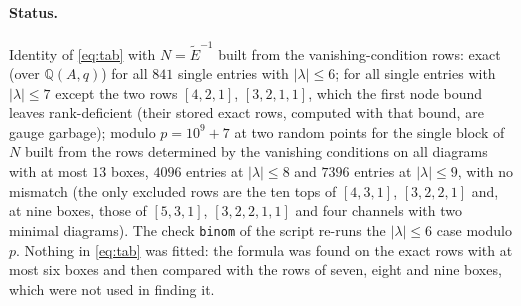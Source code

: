 \documentclass[11pt]{article}
\newcommand{\Et}{\widetilde{E}}
\newcommand{\LMPH}[1]{\texttt{#1}}
\begin{document}
\paragraph{Status.}  Identity of \eqref{eq:tab} with $N=\Et^{-1}$ built from the vanishing-condition rows: exact (over
$\mathbb Q(A,q)$) for all $841$ single entries with $|\lambda|\le6$; for all single entries with $|\lambda|\le7$ except
the two rows $[4,2,1]$, $[3,2,1,1]$, which the first node bound leaves rank-deficient (their stored exact rows, computed
with that bound, are gauge garbage); modulo $p=10^9+7$ at two random points for the single block of $N$ built from the rows determined by the
vanishing conditions on all diagrams with at most $13$ boxes, $4096$ entries at $|\lambda|\le8$ and $7396$ entries
at $|\lambda|\le9$, with no mismatch (the only excluded rows are the ten tops of $[4,3,1]$, $[3,2,2,1]$ and, at nine
boxes, those of $[5,3,1]$, $[3,2,2,1,1]$ and four channels with two minimal diagrams).  The check \LMPH{binom} of the
script re-runs the $|\lambda|\le6$ case modulo $p$.  Nothing in \eqref{eq:tab} was fitted: the formula was found on the exact
rows with at most six boxes and then compared with the rows of seven, eight and nine boxes, which were not used in
finding it.
\end{document}
